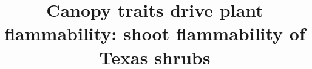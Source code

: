 \documentclass{bmcart}
\begin{document}
\begin{frontmatter}

\begin{fmbox}


\title{Canopy traits drive plant flammability: shoot flammability of Texas shrubs}


\author[
   addressref={aff1},                   %
   email={azaj.mahmud@email.com}        %
]{ }
\author[
   addressref={aff1,aff2},
   corref={aff2},                       %
   email={dylan.schwilk@ttu.edu}        %
]{ }






\end{fmbox}
\end{frontmatter}
\end{document}

